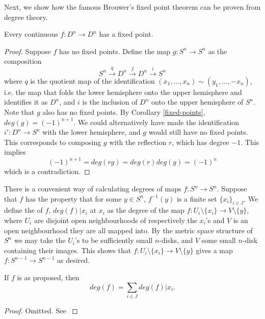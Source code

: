 Next, we show how the famous Brouwer's fixed point theorem can be proven from degree theory.
\begin{theorem}
Every continuous $f:D^n\rightarrow D^n$ has a fixed point.
\end{theorem}
\begin{proof}
Suppose $f$ has no fixed points. Define the map $g:S^n\rightarrow S^n$ as the composition 
$$S^n\xrightarrow{q}D^n\xrightarrow{f}D^n\xrightarrow{i}S^n$$
where $q$ is the quotient map of the identification $(x_1,\dots,x_n)\sim (y_1,\dots,-x_n)$, i.e. the map that folds the lower hemisphere onto the upper hemisphere and identifies it as $D^n$, and $i$ is the inclusion of $D^n$ onto the upper hemisphere of $S^n$. Note that $g$ also has no fixed points. By Corollary \ref{fixed-points}, $deg(g)=(-1)^{n+1}$. We could alternatively have made the identification $i':D^n\rightarrow S^n$ with the lower hemisphere, and $g$ would still have no fixed points. This corresponds to composing $g$ with the reflection $r$, which has degree $-1$. This implies
$$(-1)^{n+1}=deg(rg)=deg(r)deg(g)=(-1)^{n}$$
which is a contradiction.
\end{proof}


There is a convenient way of calculating degrees of maps $f:S^n\rightarrow S^n$. Suppose that $f$ has the property that for some $y\in S^n$, $f^{-1}(y)$ is a finite set $\{x_i\}_{i\in J}$. We define the  of $f$, $deg(f)|{x_i}$ at $x_i$ as the degree of the map $f:U_i\setminus \{x_i\}\rightarrow V\setminus\{y\}$, where $U_i$ are disjoint open neighbourhoods of respectively the $x_i$'s and $V$ is an open neighbourhood they are all mapped into. By the metric space structure of $S^n$ we may take the $U_i$'s to be sufficiently small $n$-disks, and $V$ some small $n$-disk containing their images. This shows that $f:U_i\setminus \{x_i\}\rightarrow V\setminus\{y\}$ gives a map $f:S^{n-1}\rightarrow S^{n-1}$ as desired.

\begin{proposition}\label{local-degree}
If $f$ is as proposed, then $$deg(f)=\sum_{i\in J}deg(f)|{x_i}.$$
\end{proposition}
\begin{proof}
Omitted. See \cite{Hatcher}
\end{proof}